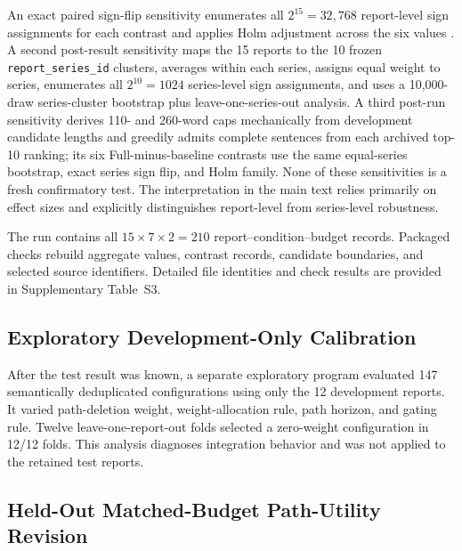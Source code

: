 \documentclass[information,article,submit,moreauthors]{Definitions/mdpi}
\begin{document}
An exact paired sign-flip sensitivity enumerates all $2^{15}=32{,}768$ report-level sign assignments for each contrast and applies Holm adjustment across the six values \cite{holm1979simple}. A second post-result sensitivity maps the 15 reports to the 10 frozen \texttt{report\_series\_id} clusters, averages within each series, assigns equal weight to series, enumerates all $2^{10}=1024$ series-level sign assignments, and uses a 10,000-draw series-cluster bootstrap plus leave-one-series-out analysis. A third post-run sensitivity derives 110- and 260-word caps mechanically from development candidate lengths and greedily admits complete sentences from each archived top-10 ranking; its six Full-minus-baseline contrasts use the same equal-series bootstrap, exact series sign flip, and Holm family. None of these sensitivities is a fresh confirmatory test. The interpretation in the main text relies primarily on effect sizes and explicitly distinguishes report-level from series-level robustness.

The run contains all $15\times7\times2=210$ report--condition--budget records. Packaged checks rebuild aggregate values, contrast records, candidate boundaries, and selected source identifiers. Detailed file identities and check results are provided in Supplementary Table~S3.

\subsection{Exploratory Development-Only Calibration}

After the test result was known, a separate exploratory program evaluated 147 semantically deduplicated configurations using only the 12 development reports. It varied path-deletion weight, weight-allocation rule, path horizon, and gating rule. Twelve leave-one-report-out folds selected a zero-weight configuration in 12/12 folds. This analysis diagnoses integration behavior and was not applied to the retained test reports.

\subsection{Held-Out Matched-Budget Path-Utility Revision}
\end{document}

